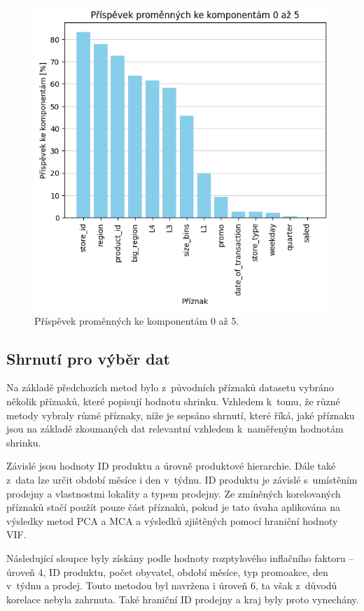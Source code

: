 \begin{figure}[h!]
    \centering
    \includegraphics[width=.6\textwidth]{obrazky/pripravadat/mca-prispevky.png}
    \caption{Příspěvek proměnných ke komponentám 0 až 5.}
    \label{obr:nb:mca_prispevek}
\end{figure}



\subsection*{Shrnutí pro výběr dat}

Na základě předchozích metod bylo z~původních příznaků datasetu 
vybráno několik příznaků, které popisují hodnotu shrinku.
Vzhledem k~tomu, že různé metody vybraly různé příznaky, níže je sepsáno shrnutí, které říká, jaké příznaku jsou na základě zkoumaných dat relevantní vzhledem k~naměřeným hodnotám shrinku. 

Závislé jsou hodnoty ID produktu a úrovně produktové hierarchie. Dále také z~data lze určit období měsíce i den v~týdnu. ID produktu je závislé s~umístěním prodejny a vlastnostmi lokality a typem prodejny.  Ze zmíněných korelovaných příznaků stačí použít pouze část příznaků, pokud je tato úvaha aplikována na výsledky metod PCA a MCA a výsledků zjištěných pomocí hraniční hodnoty VIF.

Následující sloupce byly získány podle hodnoty rozptylového inflačního faktoru -- úroveň 4, ID produktu, počet obyvatel, období měsíce, typ promoakce, den v~týdnu a prodej. Touto metodou byl navržena i úroveň 6, ta však z~důvodů korelace nebyla zahrnuta. Také hraniční ID prodejny a kraj byly proto vynechány. 
    
